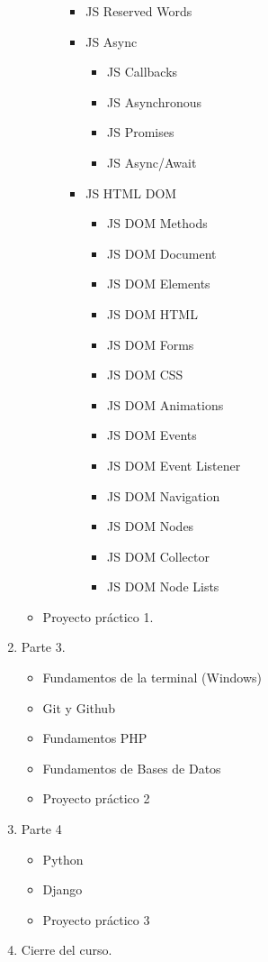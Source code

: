 \documentclass[12pt, letterpaper]{article}
\begin{document}
\begin{enumerate}
\begin{itemize}
\begin{enumerate}
\begin{itemize}
                \item JS Reserved Words
                \item JS Async
                \begin{itemize}
                    \item JS Callbacks
                    \item JS Asynchronous
                    \item JS Promises
                    \item JS Async/Await
                \end{itemize}
                \item JS HTML DOM
                \begin{itemize}
                    \item JS DOM Methods
                    \item JS DOM Document
                    \item JS DOM Elements
                    \item JS DOM HTML
                    \item JS DOM Forms
                    \item JS DOM CSS
                    \item JS DOM Animations
                    \item JS DOM Events
                    \item JS DOM Event Listener
                    \item JS DOM Navigation
                    \item JS DOM Nodes
                    \item JS DOM Collector
                    \item JS DOM Node Lists
                \end{itemize}
            \end{itemize}
        \end{enumerate}
        \item Proyecto práctico 1.
    \end{itemize}
    \item Parte 3.
    \begin{itemize}
        \item Fundamentos de la terminal (Windows)
        \item Git y Github
        \item Fundamentos PHP
        \item Fundamentos de Bases de Datos
        \item Proyecto práctico 2
    \end{itemize}
    \item Parte 4
    \begin{itemize}
        \item Python
        \item Django
        \item Proyecto práctico 3
    \end{itemize}
    \item Cierre del curso.
\end{enumerate}
\end{document}
